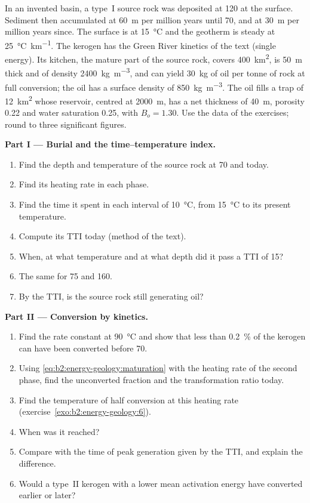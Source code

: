 \begin{problem}\label{pb:b2:energy-geology:1}
In an invented basin, a type~I source rock was deposited at \qty{120}{\Ma} at the surface.
Sediment then accumulated at \qty{60}{m} per million years until \qty{70}{\Ma}, and at \qty{30}{m}
per million years since. The surface is at \qty{15}{\celsius} and the geotherm is steady at
\qty{25}{\celsius\per\km}. The kerogen has the Green River kinetics of the text (single energy).
Its kitchen, the mature part of the source rock, covers \qty{400}{km^2}, is \qty{50}{m} thick and
of density \qty{2400}{kg.m^{-3}}, and can yield \qty{30}{kg} of oil per tonne of rock at full
conversion; the oil has a surface density of \qty{850}{kg.m^{-3}}. The oil fills a trap of
\qty{12}{km^2} whose reservoir, centred at \qty{2000}{m}, has a net thickness of \qty{40}{m},
porosity 0.22 and water saturation 0.25, with $B_o = 1.30$. Use the data of the exercises; round to
three significant figures.

\noindent\textbf{Part I --- Burial and the time--temperature index.}
\begin{enumerate}
  \item Find the depth and temperature of the source rock at \qty{70}{\Ma} and today.
  \item Find its heating rate in each phase.
  \item Find the time it spent in each interval of \qty{10}{\celsius}, from \qty{15}{\celsius} to
        its present temperature.
  \item Compute its TTI today (method of the text).
  \item When, at what temperature and at what depth did it pass a TTI of 15?
  \item The same for 75 and 160.
  \item By the TTI, is the source rock still generating oil?
\end{enumerate}

\noindent\textbf{Part II --- Conversion by kinetics.}
\begin{enumerate}[resume]
  \item Find the rate constant at \qty{90}{\celsius} and show that less than \qty{0.2}{\percent} of
        the kerogen can have been converted before \qty{70}{\Ma}.
  \item Using \eqref{eq:b2:energy-geology:maturation} with the heating rate of the second phase,
        find the unconverted fraction and the transformation ratio today.
  \item Find the temperature of half conversion at this heating rate (exercise~\ref{exo:b2:energy-geology:6}).
  \item When was it reached?
  \item Compare with the time of peak generation given by the TTI, and explain the difference.
  \item Would a type~II kerogen with a lower mean activation energy have converted earlier or later?
\end{enumerate}


\end{problem}
